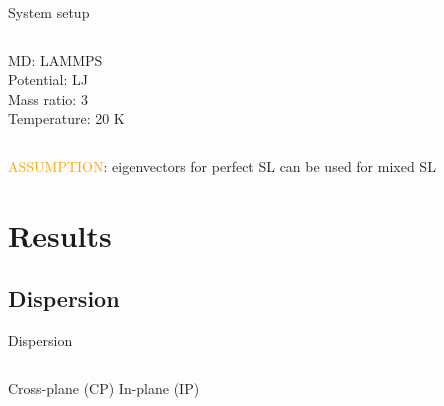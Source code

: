 \documentclass{beamer}
\begin{document}
\begin{frame}{\small{System setup}}
\hspace{-1cm}
\vspace{-1cm}
\begin{columns}
MD: LAMMPS\\
Potential: LJ\\
Mass ratio: 3\\
Temperature: 20 K

\vspace*{-2cm}
\hspace{1cm}
\begin{figure}[t]
\begin{center}
\renewcommand{\figure}{Fig.}
\label{fig:md_domain}
\end{center}
\end{figure}
\end{columns}
\vspace{1cm}
\hspace{-0.5cm}\textcolor{orange}{ASSUMPTION}: eigenvectors for perfect SL can be used for mixed SL
\end{frame}

\section{Results}
\subsection{Dispersion}
\begin{frame}{\small{Dispersion}}
\begin{columns}
Cross-plane (CP)
\newline
\newline
\newline
\newline
\newline
In-plane (IP)
\begin{figure}[!h]
\vspace*{-0.8cm}
\begin{center}
\renewcommand{\figure}{Fig.}
\label{fig:sed}
\end{center}
\end{figure}
\begin{figure}[!h]
\vspace*{-0.8cm}
\begin{center}
\renewcommand{\figure}{Fig.}
\label{fig:dispersion}
\end{center}
\end{figure}
\end{columns}
\end{frame}
\end{document}
